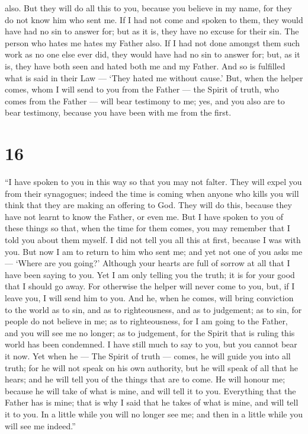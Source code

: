 also.  But they will do all this to you, because you
believe in my name, for they do not know him who sent me. 
If I had not come and spoken to them, they would have had no sin to
answer for; but as it is, they have no excuse for their sin.
 The person who hates me hates my Father also.
 If I had not done amongst them such work as no one else
ever did, they would have had no sin to answer for; but, as it is, they
have both seen and hated both me and my Father.  And so is
fulfilled what is said in their Law --- `They hated me without cause.'
 But, when the helper comes, whom I will send to you from
the Father --- the Spirit of truth, who comes from the Father --- will
bear testimony to me;  yes, and you also are to bear
testimony, because you have been with me from the first.

\hypertarget{section-15}{%
\section{16}\label{section-15}}

 ``I have spoken to you in this way so that you may not
falter.  They will expel you from their synagogues; indeed
the time is coming when anyone who kills you will think that they are
making an offering to God.  They will do this, because they
have not learnt to know the Father, or even me.  But I have
spoken to you of these things so that, when the time for them comes, you
may remember that I told you about them myself.  I did not
tell you all this at first, because I was with you. But now I am to
return to him who sent me; and yet not one of you asks me --- `Where are
you going?'  Although your hearts are full of sorrow at all
that I have been saying to you.  Yet I am only telling you
the truth; it is for your good that I should go away. For otherwise the
helper will never come to you, but, if I leave you, I will send him to
you.  And he, when he comes, will bring conviction to the
world as to sin, and as to righteousness, and as to judgement;
 as to sin, for people do not believe in me; 
as to righteousness, for I am going to the Father, and you will see me
no longer;  as to judgement, for the Spirit that is ruling
this world has been condemned.  I have still much to say to
you, but you cannot bear it now.  Yet when he --- The
Spirit of truth --- comes, he will guide you into all truth; for he will
not speak on his own authority, but he will speak of all that he hears;
and he will tell you of the things that are to come.  He
will honour me; because he will take of what is mine, and will tell it
to you.  Everything that the Father has is mine; that is
why I said that he takes of what is mine, and will tell it to you.
 In a little while you will no longer see me; and then in a
little while you will see me indeed.''


